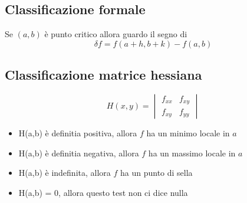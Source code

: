 \subsection{Classificazione formale}

Se $(a,b)$ è punto critico allora guardo il segno di
$$\delta f = f(a+h,b+k)-f(a,b)$$

\subsection{Classificazione matrice hessiana}

$$
H(x,y) = \begin{vmatrix}
f_{xx} & f_{xy} \\
f_{xy} & f_{yy}
\end{vmatrix}
$$

\begin{itemize}
\item H(a,b) è definitia positiva, allora $f$ ha un minimo locale in $a$
\item H(a,b) è definitia negativa, allora $f$ ha un massimo locale in $a$
\item H(a,b) è indefinita, allora $f$ ha un punto di sella
\item H(a,b) = 0, allora questo test non ci dice nulla
\end{itemize}